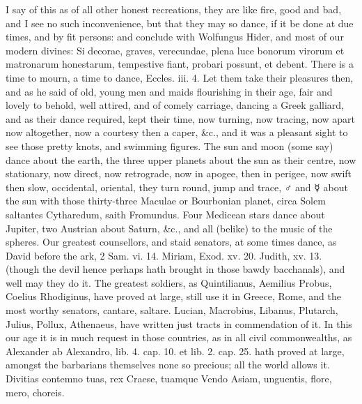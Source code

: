 {I say of this as of all other honest recreations, they are like fire,
good and bad, and I see no such inconvenience, but that they may so
dance, if it be done at due times, and by fit persons: and conclude
with Wolfungus Hider, and most of our modern divines: Si decorae,
graves, verecundae, plena luce bonorum virorum et matronarum
honestarum, tempestive fiant, probari possunt, et debent. There is a
time to mourn, a time to dance, Eccles. iii. 4. Let them take their
pleasures then, and as  he said of old, young men and maids
flourishing in their age, fair and lovely to behold, well attired, and
of comely carriage, dancing a Greek galliard, and as their dance
required, kept their time, now turning, now tracing, now apart now
altogether, now a courtesy then a caper, \&c., and it was a pleasant
sight to see those pretty knots, and swimming figures. The sun and moon
(some say) dance about the earth, the three upper planets about the sun
as their centre, now stationary, now direct, now retrograde, now in
apogee, then in perigee, now swift then slow, occidental, oriental,
they turn round, jump and trace, ♂ and ☿ about the sun with those
thirty-three Maculae or Bourbonian planet, circa Solem saltantes
Cytharedum, saith Fromundus. Four Medicean stars dance about Jupiter,
two Austrian about Saturn, \&c., and all (belike) to the music of the
spheres. Our greatest counsellors, and staid senators, at some times
dance, as David before the ark, 2 Sam. vi. 14. Miriam, Exod. xv. 20.
Judith, xv. 13. (though the devil hence perhaps hath brought in those
bawdy bacchanals), and well may they do it. The greatest soldiers, as
 Quintilianus, Aemilius Probus, Coelius Rhodiginus,
have proved at large, still use it in Greece, Rome, and the most worthy
senators, cantare, saltare. Lucian, Macrobius, Libanus, Plutarch,
Julius, Pollux, Athenaeus, have written just tracts in commendation of
it. In this our age it is in much request in those countries, as in all
civil commonwealths, as Alexander ab Alexandro, lib. 4. cap. 10. et
lib. 2. cap. 25. hath proved at large, amongst the barbarians
themselves none so precious; all the world allows it.
Divitias contemno tuas, rex Craese, tuamque
Vendo Asiam, unguentis, flore, mero, choreis.

}
